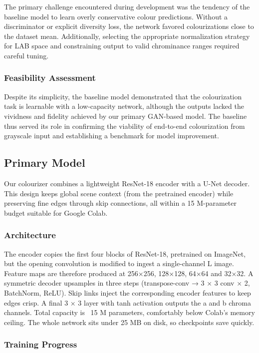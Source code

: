 \documentclass{article} %
\begin{document}
The primary challenge encountered during development was the tendency of the baseline model to learn overly conservative colour predictions. Without a discriminator or explicit 
diversity loss, the network favored colourizations close to the dataset mean. Additionally, selecting the appropriate normalization strategy for LAB space and constraining output to 
valid chrominance ranges required careful tuning.

\subsubsection{Feasibility Assessment}

Despite its simplicity, the baseline model demonstrated that the colourization task is learnable with a low-capacity network, although the outputs lacked the vividness and fidelity 
achieved by our primary GAN-based model. The baseline thus served its role in confirming the viability of end-to-end colourization from grayscale input and establishing a benchmark 
for model improvement.

\subsection{Primary Model}

Our colourizer combines a lightweight ResNet-18 encoder with a U-Net decoder. This design keeps global scene context (from the pretrained encoder) while preserving fine edges through skip connections, all within a 15 M-parameter budget suitable for Google Colab.

\subsubsection{Architecture}

The encoder copies the first four blocks of ResNet-18, pretrained on ImageNet, but the opening convolution is modified to ingest a single-channel L image. Feature maps are therefore produced at 256×256, 128×128, 64×64 and 32×32.
A symmetric decoder upsamples in three steps (transpose-conv → 3 × 3 conv × 2, BatchNorm, ReLU). Skip links inject the corresponding encoder features to keep edges crisp. A final 3 × 3 layer with tanh activation outputs the a and b chroma channels. Total capacity is ~15 M parameters, comfortably below Colab’s memory ceiling. The whole network sits under 25 MB on disk, so checkpoints save quickly.

\subsubsection{Training Progress}
\end{document}
